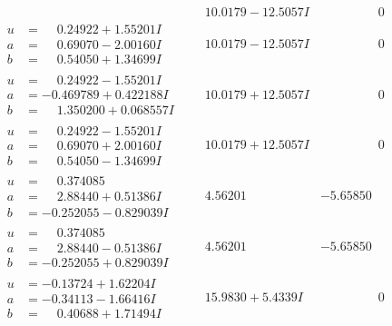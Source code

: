 \documentclass[1p]{elsarticle_modified}
\theoremstyle{definition}
\begin{document}
$$\begin{array}{c|c|c}
 & \phantom{-}10.0179 - 12.5057 I & \phantom{-0.000000 } 0 \\ \hline\begin{aligned}
u &= \phantom{-}0.24922 + 1.55201 I \\
a &= \phantom{-}0.69070 - 2.00160 I \\
b &= \phantom{-}0.54050 + 1.34699 I\end{aligned}
 & \phantom{-}10.0179 - 12.5057 I & \phantom{-0.000000 } 0 \\ \hline\begin{aligned}
u &= \phantom{-}0.24922 - 1.55201 I \\
a &= -0.469789 + 0.422188 I \\
b &= \phantom{-}1.350200 + 0.068557 I\end{aligned}
 & \phantom{-}10.0179 + 12.5057 I & \phantom{-0.000000 } 0 \\ \hline\begin{aligned}
u &= \phantom{-}0.24922 - 1.55201 I \\
a &= \phantom{-}0.69070 + 2.00160 I \\
b &= \phantom{-}0.54050 - 1.34699 I\end{aligned}
 & \phantom{-}10.0179 + 12.5057 I & \phantom{-0.000000 } 0 \\ \hline\begin{aligned}
u &= \phantom{-}0.374085\phantom{ +0.000000I} \\
a &= \phantom{-}2.88440 + 0.51386 I \\
b &= -0.252055 - 0.829039 I\end{aligned}
 & \phantom{-}4.56201\phantom{ +0.000000I} & -5.65850\phantom{ +0.000000I} \\ \hline\begin{aligned}
u &= \phantom{-}0.374085\phantom{ +0.000000I} \\
a &= \phantom{-}2.88440 - 0.51386 I \\
b &= -0.252055 + 0.829039 I\end{aligned}
 & \phantom{-}4.56201\phantom{ +0.000000I} & -5.65850\phantom{ +0.000000I} \\ \hline\begin{aligned}
u &= -0.13724 + 1.62204 I \\
a &= -0.34113 - 1.66416 I \\
b &= \phantom{-}0.40688 + 1.71494 I\end{aligned}
 & \phantom{-}15.9830 + 5.4339 I & \phantom{-0.000000 } 0 \\ \hline\begin{aligned}

\end{aligned}
\end{array}$$
\end{document}
